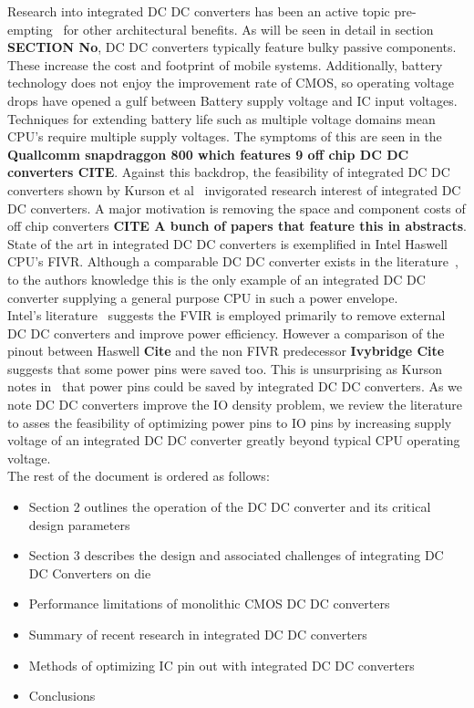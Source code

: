 \documentclass[letterpaper,twocolumn,10pt]{article}
\begin{document}
\indent Research into integrated DC DC converters has been an active topic pre-empting~\cite{Chang2010} for other architectural benefits. As will be seen in detail in section \textbf{SECTION No}, DC DC converters typically feature bulky passive components. These increase the cost and footprint of mobile systems. Additionally, battery technology does not enjoy the improvement rate of CMOS, so operating voltage drops have opened a gulf between Battery supply voltage and IC input voltages. Techniques for extending battery life such as multiple voltage domains mean CPU's require multiple supply voltages. The symptoms of this are seen in the \textbf{Quallcomm snapdraggon 800 which features 9 off chip DC DC converters CITE}. Against this backdrop, the feasibility of integrated DC DC converters shown by Kurson et al~\cite{Kurson2003} invigorated research interest of integrated DC DC converters. A major motivation is removing the space and component costs of off chip converters \textbf{CITE A bunch of papers that feature this in abstracts}.\\
\indent State of the art in integrated DC DC converters is exemplified in Intel Haswell CPU's FIVR. Although a comparable DC DC converter exists in the literature~\cite{Sturcken2012}, to the authors knowledge this is the only example of an integrated DC DC converter supplying a general purpose CPU in such a power envelope.\\
Intel's literature~\cite{Intel2010} %
suggests the FVIR is employed primarily to remove external DC DC converters and improve power efficiency. However a comparison of the pinout between Haswell \textbf{Cite} and the non FIVR predecessor \textbf{Ivybridge Cite} suggests that some power pins were saved too. This is unsurprising as Kurson notes in~\cite{Kurson2003} that power pins could be saved by integrated DC DC converters. As we note DC DC converters improve the IO density problem, we review the literature to asses the feasibility of optimizing power pins to IO pins by increasing supply voltage of an integrated DC DC converter greatly beyond typical CPU operating voltage.\\
\indent The rest of the document is ordered as follows:\\
\begin{itemize}
\item{Section 2 outlines the operation of the DC DC converter and its critical design parameters}
\item{Section 3 describes the design and associated challenges of integrating DC DC Converters on die}
\item{Performance limitations of monolithic CMOS DC DC converters}
\item{Summary of recent research in integrated DC DC converters}
\item{Methods of optimizing IC pin out with integrated DC DC converters}
\item{Conclusions}
\end{itemize}
 
\end{document}
